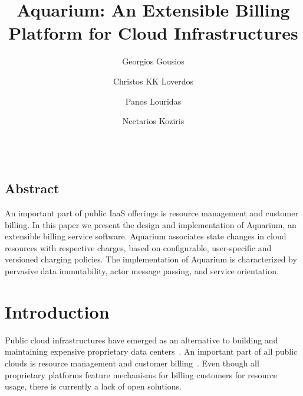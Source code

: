 \documentclass[letterpaper,twocolumn,10pt]{article}
\begin{document}
\date{}

\title{Aquarium: An Extensible Billing Platform for Cloud Infrastructures}

\author{
{\rm Georgios Gousios}\\
\and
{\rm Christos KK Loverdos}\\
\and
{\rm Panos Louridas}\\
\and
{\rm Nectarios Koziris}\\
\and
{}\\
} %

\maketitle


\thispagestyle{empty}

\subsection*{Abstract}

An important part of public IaaS offerings is resource management and
customer billing. In this paper we present the design and
implementation of Aquarium, an extensible billing service software.
Aquarium associates state changes in cloud resources with respective
charges, based on configurable, user-specific and versioned charging
policies. The implementation of Aquarium is characterized by pervasive
data immutability, actor message passing, and service orientation.

\section{Introduction}

Public cloud infrastructures have emerged as an alternative to
building and maintaining expensive proprietary data
centers~\cite{Lourid10}. An important part of all public clouds is
resource management and customer billing~\cite{Armbr10}. Even though
all proprietary platforms feature mechanisms for billing customers for
resource usage, there is currently a lack of open solutions.
\end{document}
